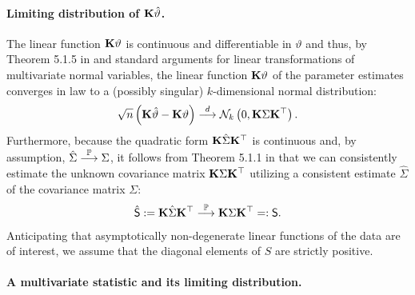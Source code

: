\documentclass[12pt]{article}
\begin{document}
\paragraph{Limiting distribution of $\mathbf{K}\hat{\protect\vartheta}$.}

The linear function $\mathbf{K} \vartheta$ is continuous and differentiable in $%
\vartheta$ and thus, by Theorem 5.1.5 in \cite{Lehmann1999} and standard
arguments for linear transformations of multivariate normal variables, the
linear function $\mathbf{K} \vartheta$ of the parameter estimates converges in law
to a (possibly singular) $k$-dimensional normal distribution: 
\begin{eqnarray}  \label{dist_f}
\sqrt{n} \left(\K \hat{\vartheta} - \K \vartheta\right) \cL \N_k\left(0, \K %
\Sigma \K^\top\right).
\end{eqnarray}
Furthermore, because the quadratic form $\mathbf{K} \hat{\Sigma} \mathbf{K}^\top$ is
continuous and, by assumption, $\hat{\Sigma} \stackrel{\mathbb{P}}{\longrightarrow} \Sigma$, it follows from
Theorem 5.1.1 in \cite{Lehmann1999} that we can consistently estimate the
unknown covariance matrix $\mathbf{K} \Sigma \mathbf{K}^\top$ utilizing a consistent
estimate $\hat{\Sigma}$ of the covariance matrix $\Sigma$: 
\begin{eqnarray*}
\hat{\textsf{S} } := \mathbf{K} \hat{\Sigma} \mathbf{K}^\top \stackrel{\mathbb{P}}{\longrightarrow} \mathbf{K} \Sigma \mathbf{K}^\top =: \textsf{S} .
\end{eqnarray*}
Anticipating that asymptotically non-degenerate linear functions of the data
are of interest, we assume that the diagonal elements of $S$ are strictly
positive.

\paragraph{A multivariate statistic and its limiting distribution.}
\end{document}
